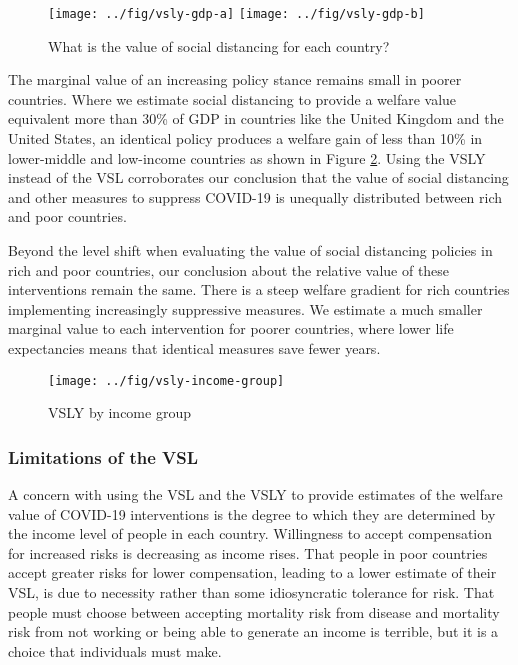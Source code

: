 \documentclass[11pt]{article}
\begin{document}
\begin{figure}[htbp!]
  \centering
  \caption{What is the value of social distancing for each country?}
  \texttt{[image: ../fig/vsly-gdp-a]}
  \texttt{[image: ../fig/vsly-gdp-b]}
  \label{fig:vsly-gdp}
\end{figure}

The marginal value of an increasing policy stance remains small in poorer countries. Where we estimate social distancing to provide a welfare value equivalent more than 30\% of GDP in countries like the United Kingdom and the United States, an identical policy produces a welfare gain of less than 10\% in lower-middle and low-income countries as shown in Figure \ref{fig:vsly-income-group}. Using the VSLY instead of the VSL corroborates our conclusion that the value of social distancing and other measures to suppress COVID-19 is unequally distributed between rich and poor countries.




Beyond the level shift when evaluating the value of social distancing policies in rich and poor countries, our conclusion about the relative value of these interventions remain the same. There is a steep welfare gradient for rich countries implementing increasingly suppressive measures. We estimate a much smaller marginal value to each intervention for poorer countries, where lower life expectancies means that identical measures save fewer years.  


\begin{figure}
\centering
\caption{VSLY by income group}
\texttt{[image: ../fig/vsly-income-group]}
\label{fig:vsly-income-group}
\end{figure}

\subsubsection{Limitations of the VSL}

A concern with using the VSL and the VSLY to provide estimates of the welfare value of COVID-19 interventions is the degree to which they are determined by the income level of people in each country. Willingness to accept compensation for increased risks is decreasing as income rises. That people in poor countries accept greater risks for lower compensation, leading to a lower estimate of their VSL, is due to necessity rather than some idiosyncratic tolerance for risk. That people must choose between accepting mortality risk from disease and mortality risk from not working or being able to generate an income is terrible, but it is a choice that individuals must make.
\end{document}
